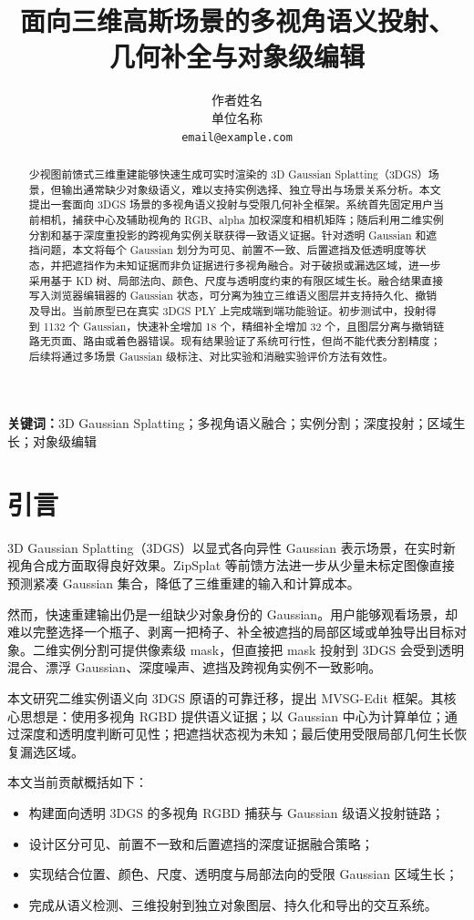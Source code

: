 \documentclass[10pt,twocolumn]{ctexart}
\title{面向三维高斯场景的多视角语义投射、\\几何补全与对象级编辑}
\author{作者姓名\\单位名称\\\texttt{email@example.com}}
\date{}
\newcommand{\method}{MVSG-Edit}
\begin{document}
\maketitle

\begin{abstract}
少视图前馈式三维重建能够快速生成可实时渲染的 3D Gaussian Splatting（3DGS）场景，但输出通常缺少对象级语义，难以支持实例选择、独立导出与场景关系分析。本文提出一套面向 3DGS 场景的多视角语义投射与受限几何补全框架。系统首先固定用户当前相机，捕获中心及辅助视角的 RGB、alpha 加权深度和相机矩阵；随后利用二维实例分割和基于深度重投影的跨视角实例关联获得一致语义证据。针对透明 Gaussian 和遮挡问题，本文将每个 Gaussian 划分为可见、前置不一致、后置遮挡及低透明度等状态，并把遮挡作为未知证据而非负证据进行多视角融合。对于破损或漏选区域，进一步采用基于 KD 树、局部法向、颜色、尺度与透明度约束的有限区域生长。融合结果直接写入浏览器编辑器的 Gaussian 状态，可分离为独立三维语义图层并支持持久化、撤销及导出。当前原型已在真实 3DGS PLY 上完成端到端功能验证。初步测试中，投射得到 1132 个 Gaussian，快速补全增加 18 个，精细补全增加 32 个，且图层分离与撤销链路无页面、路由或着色器错误。现有结果验证了系统可行性，但尚不能代表分割精度；后续将通过多场景 Gaussian 级标注、对比实验和消融实验评价方法有效性。
\end{abstract}

\noindent\textbf{关键词：}3D Gaussian Splatting；多视角语义融合；实例分割；深度投射；区域生长；对象级编辑

\section{引言}

3D Gaussian Splatting（3DGS）以显式各向异性 Gaussian 表示场景，在实时新视角合成方面取得良好效果\citep{kerbl2023gaussian}。ZipSplat 等前馈方法进一步从少量未标定图像直接预测紧凑 Gaussian 集合\citep{veicht2026zipsplat}，降低了三维重建的输入和计算成本。

然而，快速重建输出仍是一组缺少对象身份的 Gaussian。用户能够观看场景，却难以完整选择一个瓶子、剥离一把椅子、补全被遮挡的局部区域或单独导出目标对象。二维实例分割可提供像素级 mask，但直接把 mask 投射到 3DGS 会受到透明混合、漂浮 Gaussian、深度噪声、遮挡及跨视角实例不一致影响。

本文研究二维实例语义向 3DGS 原语的可靠迁移，提出 \method{} 框架。其核心思想是：使用多视角 RGBD 提供语义证据；以 Gaussian 中心为计算单位；通过深度和透明度判断可见性；把遮挡状态视为未知；最后使用受限局部几何生长恢复漏选区域。

本文当前贡献概括如下：
\begin{itemize}
    \item 构建面向透明 3DGS 的多视角 RGBD 捕获与 Gaussian 级语义投射链路；
    \item 设计区分可见、前置不一致和后置遮挡的深度证据融合策略；
    \item 实现结合位置、颜色、尺度、透明度与局部法向的受限 Gaussian 区域生长；
    \item 完成从语义检测、三维投射到独立对象图层、持久化和导出的交互系统。
\end{itemize}
\end{document}
